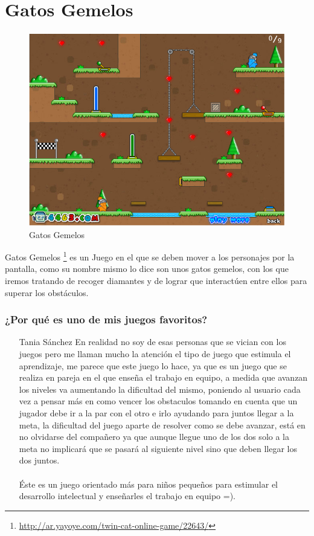 \section{Gatos Gemelos}

\begin{figure}[htbp]
\begin{center}
\includegraphics[width=.60\textwidth]{./imagenes/gatos1.png}
\caption{Gatos Gemelos}
\label{Gatos Gemelos}
\end{center}
\end{figure}
Gatos Gemelos \footnote{\url{http://ar.yayoye.com/twin-cat-online-game/22643/}} es un Juego en el que se deben mover a los personajes por la pantalla, como su nombre mismo lo dice son unos gatos gemelos, con los que iremos tratando de recoger diamantes y de lograr que interactúen entre ellos para superar los obstáculos.

\subsubsection{¿Por qué es uno de mis juegos favoritos?}
\begin{itemize}
\item[Tania Sánchez] En realidad no soy de esas personas que se vician con los juegos pero me llaman mucho la atención el tipo de juego que estimula el aprendizaje, me parece que este juego lo hace, ya que es un juego que se realiza en pareja en el que enseña el trabajo en equipo, a medida que avanzan los niveles va aumentando la dificultad del mismo, poniendo al usuario cada vez a pensar más en como vencer los obstaculos tomando en cuenta que un jugador debe ir a la par con el otro e irlo ayudando para juntos llegar a la meta, la dificultad del juego aparte de resolver como se debe avanzar, está en no olvidarse del compañero ya que aunque llegue uno de los dos solo a la meta no implicará que se pasará al siguiente nivel sino que deben llegar los dos juntos. 
\\
\\
Éste es un juego orientado más para niños pequeños para estimular el desarrollo intelectual y enseñarles el trabajo en equipo =).
\end{itemize}
